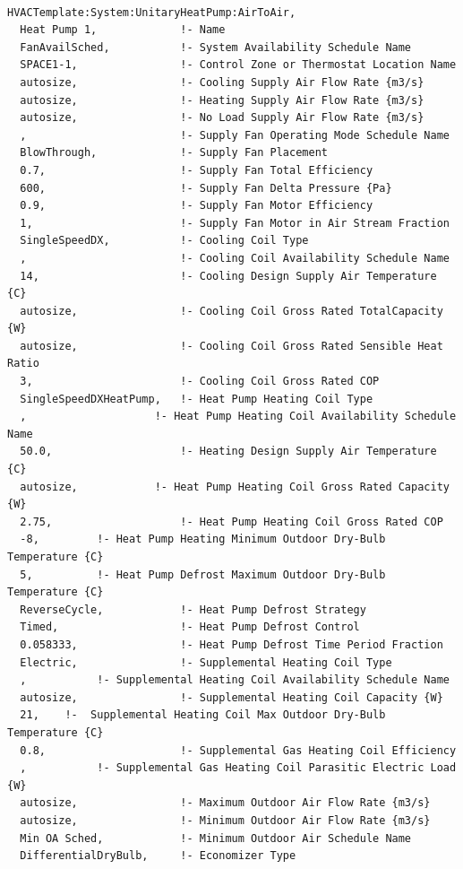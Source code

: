 \begin{lstlisting}

HVACTemplate:System:UnitaryHeatPump:AirToAir,
  Heat Pump 1,             !- Name
  FanAvailSched,           !- System Availability Schedule Name
  SPACE1-1,                !- Control Zone or Thermostat Location Name
  autosize,                !- Cooling Supply Air Flow Rate {m3/s}
  autosize,                !- Heating Supply Air Flow Rate {m3/s}
  autosize,                !- No Load Supply Air Flow Rate {m3/s}
  ,                        !- Supply Fan Operating Mode Schedule Name
  BlowThrough,             !- Supply Fan Placement
  0.7,                     !- Supply Fan Total Efficiency
  600,                     !- Supply Fan Delta Pressure {Pa}
  0.9,                     !- Supply Fan Motor Efficiency
  1,                       !- Supply Fan Motor in Air Stream Fraction
  SingleSpeedDX,           !- Cooling Coil Type
  ,                        !- Cooling Coil Availability Schedule Name
  14,                      !- Cooling Design Supply Air Temperature {C}
  autosize,                !- Cooling Coil Gross Rated TotalCapacity {W}
  autosize,                !- Cooling Coil Gross Rated Sensible Heat Ratio
  3,                       !- Cooling Coil Gross Rated COP
  SingleSpeedDXHeatPump,   !- Heat Pump Heating Coil Type
  ,                    !- Heat Pump Heating Coil Availability Schedule Name
  50.0,                    !- Heating Design Supply Air Temperature {C}
  autosize,            !- Heat Pump Heating Coil Gross Rated Capacity {W}
  2.75,                    !- Heat Pump Heating Coil Gross Rated COP
  -8,         !- Heat Pump Heating Minimum Outdoor Dry-Bulb Temperature {C}
  5,          !- Heat Pump Defrost Maximum Outdoor Dry-Bulb Temperature {C}
  ReverseCycle,            !- Heat Pump Defrost Strategy
  Timed,                   !- Heat Pump Defrost Control
  0.058333,                !- Heat Pump Defrost Time Period Fraction
  Electric,                !- Supplemental Heating Coil Type
  ,           !- Supplemental Heating Coil Availability Schedule Name
  autosize,                !- Supplemental Heating Coil Capacity {W}
  21,    !-  Supplemental Heating Coil Max Outdoor Dry-Bulb Temperature {C}
  0.8,                     !- Supplemental Gas Heating Coil Efficiency
  ,           !- Supplemental Gas Heating Coil Parasitic Electric Load {W}
  autosize,                !- Maximum Outdoor Air Flow Rate {m3/s}
  autosize,                !- Minimum Outdoor Air Flow Rate {m3/s}
  Min OA Sched,            !- Minimum Outdoor Air Schedule Name
  DifferentialDryBulb,     !- Economizer Type

\end{lstlisting}
